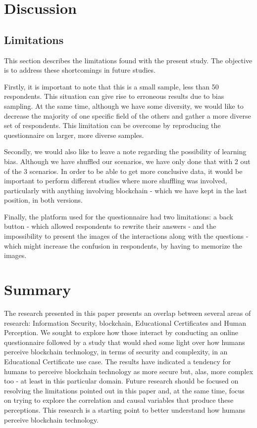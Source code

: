 \section{Discussion}

\subsection{Limitations}

This section describes the limitations found with the present study. The objective is to address these shortcomings in future studies. 
  
Firstly, it is important to note that this is a small sample, less than 50 respondents. This situation can give rise to erroneous results due to bias sampling. At the same time, although we have some diversity, we would like to decrease the majority of one specific field of the others and gather a more diverse set of respondents. This limitation can be overcome by reproducing the questionnaire on larger, more diverse samples. 
  
Secondly, we would also like to leave a note regarding the possibility of learning bias. Although we have shuffled our scenarios, we have only done that with 2 out of the 3 scenarios. In order to be able to get more conclusive data, it would be important to perform different studies where more shuffling was involved, particularly with anything involving blockchain - which we have kept in the last position, in both versions. 
  
Finally, the platform used for the questionnaire had two limitations: a back button - which allowed respondents to rewrite their answers - and the impossibility to present the images of the interactions along with the questions - which might increase the confusion in respondents, by having to memorize the images.
  
\section{Summary}

The research presented in this paper presents an overlap between several areas of research: Information Security, blockchain, Educational Certificates and Human Perception. We sought to explore how those interact by conducting an online questionnaire followed by a study that would shed some light over how humans perceive blockchain technology, in terms of security and complexity, in an Educational Certificate use case. The results have indicated a tendency for humans to perceive blockchain technology as more secure but, alas, more complex too - at least in this particular domain. Future research should be focused on resolving the limitations pointed out in this paper and, at the same time, focus on trying to explore the correlation and causal variables that produce these perceptions. This research is a starting point to better understand how humans perceive blockchain technology.